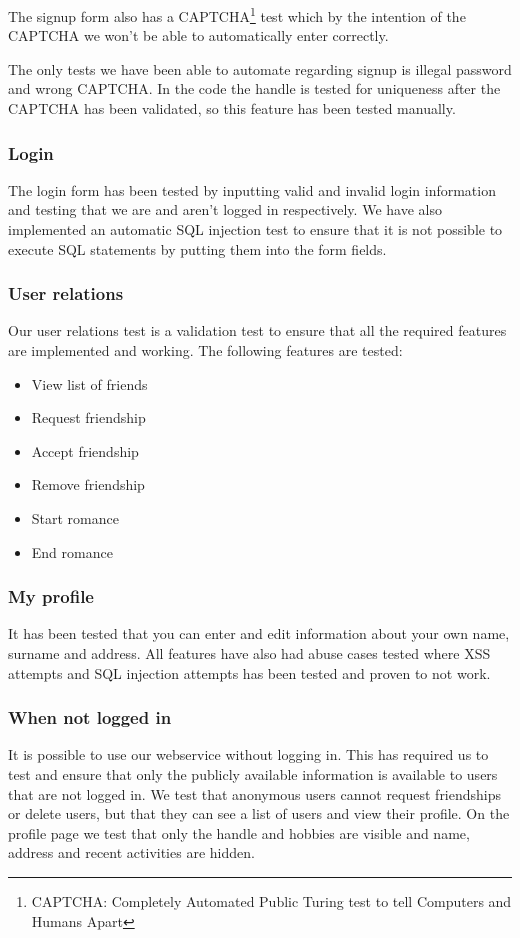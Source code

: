 \documentclass[a4paper]{article}
\begin{document}
The signup form also has a CAPTCHA\footnote{CAPTCHA: Completely Automated Public Turing test to tell Computers and Humans Apart} test which by the intention of the CAPTCHA we won't be able to automatically enter correctly.

The only tests we have been able to automate regarding signup is illegal password and wrong CAPTCHA. In the code the handle is tested for uniqueness after the CAPTCHA has been validated, so this feature has been tested manually.

\subsubsection{Login}
The login form has been tested by inputting valid and invalid login information and testing that we are and aren't logged in respectively. We have also implemented an automatic SQL injection test to ensure that it is not possible to execute SQL statements by putting them into the form fields.

\subsubsection{User relations}
Our user relations test is a validation test to ensure that all the required features are implemented and working. The following features are tested:
\begin{itemize}
\item View list of friends
\item Request friendship
\item Accept friendship
\item Remove friendship
\item Start romance
\item End romance
\end{itemize}

\subsubsection{My profile}
It has been tested that you can enter and edit information about your own name, surname and address. All features have also had abuse cases tested where XSS attempts and SQL injection attempts has been tested and proven to not work.

\subsubsection{When not logged in}
It is possible to use our webservice without logging in. This has required us to test and ensure that only the publicly available information is available to users that are not logged in.
We test that anonymous users cannot request friendships or delete users, but that they can see a list of users and view their profile.
On the profile page we test that only the handle and hobbies are visible and name, address and recent activities are hidden.
\end{document}
